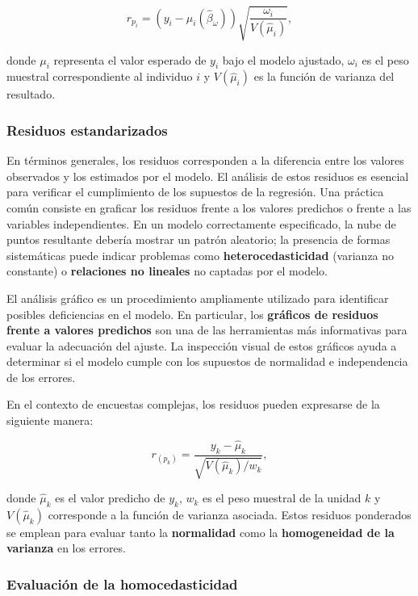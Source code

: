 \documentclass[
  spanish,
  12pt,
]{book}
\begin{document}
\[
r_{p_{i}} = \left(y_{i} - \mu_{i}(\hat{\beta}_{\omega})\right) \sqrt{\frac{\omega_{i}}{V(\hat{\mu}_{i})}},
\]

donde \(\mu_{i}\) representa el valor esperado de \(y_{i}\) bajo el modelo ajustado, \(\omega_{i}\) es el peso muestral correspondiente al individuo \(i\) y \(V(\hat{\mu}_{i})\) es la función de varianza del resultado.

\subsubsection{Residuos estandarizados}\label{residuos-estandarizados}

En términos generales, los residuos corresponden a la diferencia entre los valores observados y los estimados por el modelo. El análisis de estos residuos es esencial para verificar el cumplimiento de los supuestos de la regresión. Una práctica común consiste en graficar los residuos frente a los valores predichos o frente a las variables independientes. En un modelo correctamente especificado, la nube de puntos resultante debería mostrar un patrón aleatorio; la presencia de formas sistemáticas puede indicar problemas como \textbf{heterocedasticidad} (varianza no constante) o \textbf{relaciones no lineales} no captadas por el modelo.

El análisis gráfico es un procedimiento ampliamente utilizado para identificar posibles deficiencias en el modelo. En particular, los \textbf{gráficos de residuos frente a valores predichos} son una de las herramientas más informativas para evaluar la adecuación del ajuste. La inspección visual de estos gráficos ayuda a determinar si el modelo cumple con los supuestos de normalidad e independencia de los errores.

En el contexto de encuestas complejas, los residuos pueden expresarse de la siguiente manera:

\[
r_{(p_k)} = \frac{y_k - \hat{\mu}_k}{\sqrt{V(\hat{\mu}_k)/w_k}},
\]

donde \(\hat{\mu}_k\) es el valor predicho de \(y_k\), \(w_k\) es el peso muestral de la unidad \(k\) y \(V(\hat{\mu}_k)\) corresponde a la función de varianza asociada. Estos residuos ponderados se emplean para evaluar tanto la \textbf{normalidad} como la \textbf{homogeneidad de la varianza} en los errores.

\subsubsection{Evaluación de la homocedasticidad}\label{evaluaciuxf3n-de-la-homocedasticidad}
\end{document}
